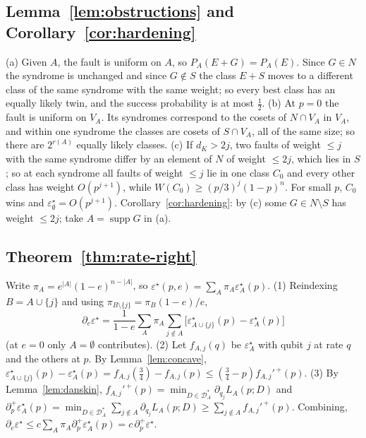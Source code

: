 \documentclass[11pt,a4paper]{article}
\theoremstyle{plain}
\theoremstyle{definition}
\theoremstyle{remark}
\newcommand{\err}{\varepsilon^{\star}}
\newcommand{\supp}{\operatorname{supp}}
\begin{document}
\subsection{Lemma~\ref{lem:obstructions} and Corollary~\ref{cor:hardening}}
(a) Given $A$, the fault is uniform on $A$, so $P_A(E+G)=P_A(E)$. Since $G\in N$ the syndrome is unchanged and since $G\notin S$ the class $E+S$ moves to a different class of the same syndrome with the same weight; so every best class has an equally likely twin, and the success probability is at most $\tfrac12$.
(b) At $p=0$ the fault is uniform on $V_A$. Its syndromes correspond to the cosets of $N\cap V_A$ in $V_A$, and within one syndrome the classes are cosets of $S\cap V_A$, all of the same size; so there are $2^{r(A)}$ equally likely classes.
(c) If $d_K>2j$, two faults of weight $\le j$ with the same syndrome differ by an element of $N$ of weight $\le2j$, which lies in $S$; so at each syndrome all faults of weight $\le j$ lie in one class $C_0$ and every other class has weight $O(p^{j+1})$, while $W(C_0)\ge(p/3)^j(1-p)^n$. For small $p$, $C_0$ wins and $\err_\emptyset=O(p^{j+1})$.
Corollary~\ref{cor:hardening}: by (c) some $G\in N\setminus S$ has weight $\le2j$; take $A=\supp G$ in (a).

\subsection{Theorem~\ref{thm:rate-right}}
Write $\pi_A=e^{|A|}(1-e)^{n-|A|}$, so $\err(p,e)=\sum_A\pi_A\err_A(p)$. (1) Reindexing $B=A\cup\{j\}$ and using $\pi_{B\setminus\{j\}}=\pi_B(1-e)/e$,
\[
\partial_e\err=\frac1{1-e}\sum_A\pi_A\sum_{j\notin A}\big[\err_{A\cup\{j\}}(p)-\err_A(p)\big]
\]
(at $e=0$ only $A=\emptyset$ contributes). (2) Let $f_{A,j}(q)$ be $\err_A$ with qubit $j$ at rate $q$ and the others at $p$. By Lemma~\ref{lem:concave}, $\err_{A\cup\{j\}}(p)-\err_A(p)=f_{A,j}(\tfrac34)-f_{A,j}(p)\le(\tfrac34-p)f_{A,j}'^{\,+}(p)$. (3) By Lemma~\ref{lem:danskin}, $f_{A,j}'^{\,+}(p)=\min_{D\in\mathcal D^\ast_A}\partial_{q_j}L_A(p;D)$ and $\partial_p^+\err_A(p)=\min_{D\in\mathcal D^\ast_A}\sum_{j\notin A}\partial_{q_j}L_A(p;D)\ge\sum_{j\notin A}f_{A,j}'^{\,+}(p)$. Combining, $\partial_e\err\le c\sum_A\pi_A\partial_p^+\err_A(p)=c\,\partial_p^+\err$.
\end{document}
